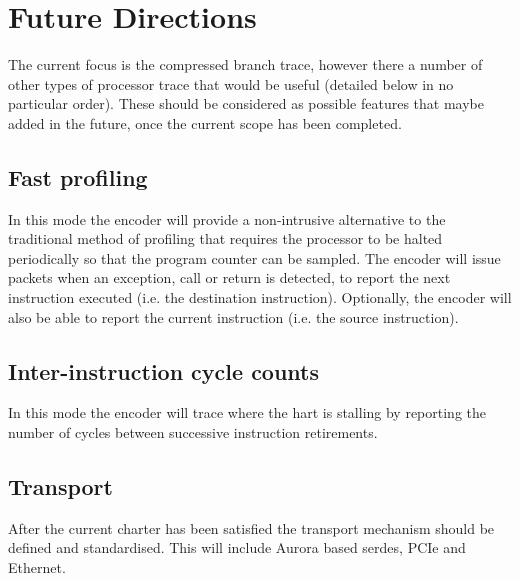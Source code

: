 \chapter{Future Directions} \label{Future}

The current focus is the compressed branch trace, however there a
number of other types of processor trace that would be useful 
(detailed below in no particular order). These
should be considered as possible features that maybe added in the future,
once the current scope has been completed.

\section{Fast profiling}

In this mode the encoder will provide a non-intrusive alternative to
the traditional method of profiling that requires the processor to
be halted periodically so that the program counter can be sampled.
The encoder will issue packets when an exception, call or return is
detected, to report the next instruction executed (i.e. the
destination instruction).  Optionally, the encoder will also be able to
report the current instruction (i.e. the source instruction).

\section{Inter-instruction cycle counts}

In this mode the encoder will trace where the hart is stalling by
reporting the number of cycles between successive instruction
retirements.

\section{Transport}

After the current charter has been satisfied the transport mechanism
should be defined and standardised. This will include Aurora based
serdes, PCIe and Ethernet.
